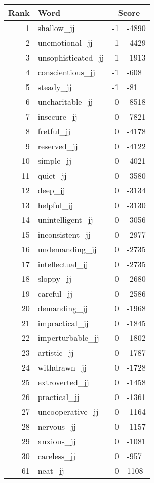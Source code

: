 \begin{longtable}[!htbp]{| rlr@{.}l |}
    \hline
    \textbf{Rank} & \textbf{Word} & \multicolumn{2}{c|}{\textbf{Score}} \\
    \hline
    \endhead
    1 & shallow\_jj & -1 & -4890 \\
    2 & unemotional\_jj & -1 & -4429 \\
    3 & unsophisticated\_jj & -1 & -1913 \\
    4 & conscientious\_jj & -1 & -608 \\
    5 & steady\_jj & -1 & -81 \\
    6 & uncharitable\_jj & 0 & -8518 \\
    7 & insecure\_jj & 0 & -7821 \\
    8 & fretful\_jj & 0 & -4178 \\
    9 & reserved\_jj & 0 & -4122 \\
    10 & simple\_jj & 0 & -4021 \\
    11 & quiet\_jj & 0 & -3580 \\
    12 & deep\_jj & 0 & -3134 \\
    13 & helpful\_jj & 0 & -3130 \\
    14 & unintelligent\_jj & 0 & -3056 \\
    15 & inconsistent\_jj & 0 & -2977 \\
    16 & undemanding\_jj & 0 & -2735 \\
    17 & intellectual\_jj & 0 & -2735 \\
    18 & sloppy\_jj & 0 & -2680 \\
    19 & careful\_jj & 0 & -2586 \\
    20 & demanding\_jj & 0 & -1968 \\
    21 & impractical\_jj & 0 & -1845 \\
    22 & imperturbable\_jj & 0 & -1802 \\
    23 & artistic\_jj & 0 & -1787 \\
    24 & withdrawn\_jj & 0 & -1728 \\
    25 & extroverted\_jj & 0 & -1458 \\
    26 & practical\_jj & 0 & -1361 \\
    27 & uncooperative\_jj & 0 & -1164 \\
    28 & nervous\_jj & 0 & -1157 \\
    29 & anxious\_jj & 0 & -1081 \\
    30 & careless\_jj & 0 & -957 \\
    61 & neat\_jj & 0 & 1108 \\

\end{longtable}
